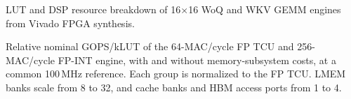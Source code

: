 \caption{LUT and DSP resource breakdown of 16$\times$16 WoQ and WKV GEMM engines from Vivado FPGA synthesis.}

\caption{Relative nominal GOPS/kLUT of the 64-MAC/cycle FP TCU and 256-MAC/cycle FP-INT engine, with and without memory-subsystem costs, at a common 100\,MHz reference. Each group is normalized to the FP TCU. LMEM banks scale from 8 to 32, and cache banks and HBM access ports from 1 to 4.}
